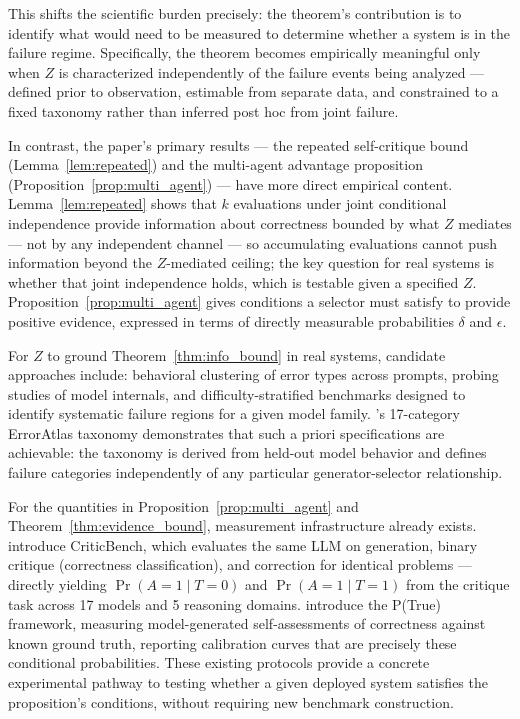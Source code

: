 \documentclass[11pt]{article}
\begin{document}
This shifts the scientific burden precisely: the theorem's contribution is to identify
what would need to be measured to determine whether a system is in the failure regime.
Specifically, the theorem becomes empirically meaningful only when $Z$ is characterized
independently of the failure events being analyzed --- defined prior to observation,
estimable from separate data, and constrained to a fixed taxonomy rather than inferred
post hoc from joint failure.

In contrast, the paper's primary results --- the repeated self-critique bound
(Lemma~\ref{lem:repeated}) and the multi-agent advantage proposition
(Proposition~\ref{prop:multi_agent}) --- have more direct empirical content.
Lemma~\ref{lem:repeated} shows that $k$ evaluations under joint conditional independence
provide information about correctness bounded by what $Z$ mediates --- not by any
independent channel --- so accumulating evaluations cannot push information beyond the
$Z$-mediated ceiling; the key question for real systems is whether that joint independence
holds, which is testable given a specified $Z$.
Proposition~\ref{prop:multi_agent} gives conditions a selector must satisfy to provide
positive evidence, expressed in terms of directly measurable probabilities $\delta$ and
$\epsilon$.

For $Z$ to ground Theorem~\ref{thm:info_bound} in real systems, candidate approaches
include: behavioral clustering of error types across prompts, probing studies of model
internals, and difficulty-stratified benchmarks designed to identify systematic failure
regions for a given model family. \citet{erroratlas2026}'s 17-category ErrorAtlas taxonomy
demonstrates that such a priori specifications are achievable: the taxonomy is derived from
held-out model behavior and defines failure categories independently of any particular
generator-selector relationship.

For the quantities in Proposition~\ref{prop:multi_agent} and Theorem~\ref{thm:evidence_bound},
measurement infrastructure already exists. \citet{lin2024criticbench} introduce CriticBench,
which evaluates the same LLM on generation, binary critique (correctness classification),
and correction for identical problems --- directly yielding $\Pr(A=1 \mid T=0)$ and
$\Pr(A=1 \mid T=1)$ from the critique task across 17 models and 5 reasoning domains.
\citet{kadavath2022ptrue} introduce the P(True) framework, measuring model-generated
self-assessments of correctness against known ground truth, reporting calibration curves
that are precisely these conditional probabilities. These existing protocols provide a
concrete experimental pathway to testing whether a given deployed system satisfies the
proposition's conditions, without requiring new benchmark construction.
\end{document}
